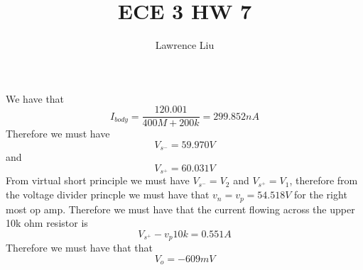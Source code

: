 \documentclass[12pt]{article}
\title{ECE 3 HW 7}
\author{Lawrence Liu}
\begin{document}
\maketitle
We have that $$I_{body}=\frac{120.001}{400M+200k}=299.852nA$$
Therefore we must have $$V_{s^{-}}=59.970V$$
and 
$$V_{s^{+}}=60.031V$$
From virtual short principle we must have $V_{s^{-}}=V_2$ and $V_{s^{+}}=V_1$, therefore from the voltage divider princple we must have that $v_n=v_p=54.518V$ for the
right most op amp. 
Therefore we must have that the current flowing across the upper 10k ohm resistor is $${V_{s^{+}}-v_p}{10k}=0.551A$$
Therefore we must have that that $$V_{o}=\boxed{-609mV}$$
\end{document}
